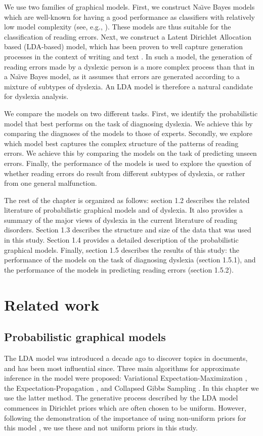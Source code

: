 We use two families of graphical models. First, we construct Na\"{\i}ve Bayes models which are well-known for having a good performance as classifiers with relatively low model complexity (see, e.g., \citealp{lit92}). These models are thus suitable for the classification of reading errors. Next, we construct a Latent Dirichlet Allocation based (LDA-based) model, which has been proven to well capture generation processes in the context of writing and text \citep{bnj03, rgss04}. In such a model, the generation of reading errors made by a dyslexic person is a more complex process than that in a Na\"{\i}ve Bayes model, as it assumes that errors are generated according to a mixture of subtypes of dyslexia. An LDA model is therefore a natural candidate for dyslexia analysis.

We compare the models on two different tasks. First, we identify the probabilistic model that best performs on the task of diagnosing dyslexia. We achieve this by comparing the diagnoses of the models to those of experts. Secondly, we explore which model best captures the complex structure of the patterns of reading errors. We achieve this by comparing the models on the task of predicting unseen errors. Finally, the performance of the models is used to explore the question of whether reading errors do result from different subtypes of dyslexia, or rather from one general malfunction.

The rest of the chapter is organized as follows: section 1.2 describes the related literature of probabilistic graphical models and of dyslexia. It also provides a summary of the major views of dyslexia in the current literature of reading disorders. Section 1.3 describes the structure and size of the data that was used in this study. Section 1.4 provides a detailed description of the probabilistic graphical models. Finally, section 1.5 describes the results of this study: the performance of the models on the task of diagnosing dyslexia (section 1.5.1), and the performance of the models in predicting reading errors (section 1.5.2).


\section{Related work}
\subsection{Probabilistic graphical models}
The LDA model was introduced a decade ago to discover topics in documents, and has been most influential since. Three main algorithms for approximate inference in the model were proposed: Variational Expectation-Maximization \citep{bnj03}, the Expectation-Propagation \citep{ml02}, and Collapsed Gibbs Sampling \citep{gs04}. In this chapter we use the latter method. The generative process described by the LDA model commences in Dirichlet priors which are often chosen to be uniform. However, following the demonstration of the importance of using non-uniform priors for this model \citep{wmm09}, we use these and not uniform priors in this study.

